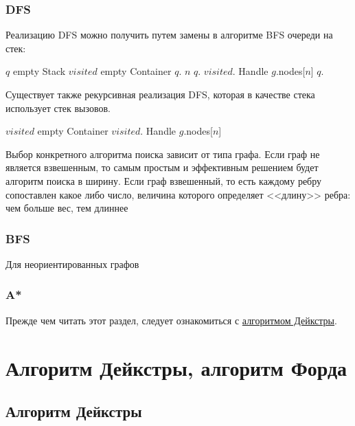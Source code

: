 \subsubsection{DFS}
Реализацию DFS можно получить путем замены в алгоритме BFS очереди на стек:
\begin{algorithmic}
  \State $q$ \asgn empty Stack
  \State $visited$ \asgn empty Container
  \State $q$.
    \State $n$ \asgn $q$.
    \State $visited$.
    \State Handle $g$.nodes[$n$]
        $q$.
      \EndIf
    \EndFor
  \EndWhile
\EndProcedure
\end{algorithmic}

Существует также рекурсивная реализация DFS, которая в качестве стека использует
стек вызовов.
\begin{algorithmic}
\State $visited$ \asgn empty Container
    \State\Return
  \EndIf
  \State $visited$.
  \State Handle $g$.nodes[$n$]
    \State {}
  \EndFor
\EndProcedure
\end{algorithmic}

Выбор конкретного алгоритма поиска зависит от типа графа. Если граф
не является взвешенным, то самым простым и эффективным решением будет
алгоритм поиска в ширину. Если граф взвешенный, то есть каждому ребру
сопоставлен какое либо число, величина которого определяет <<длину>> ребра:
чем больше вес, тем длиннее
\subsubsection{BFS}
Для неориентированных графов 
\subsubsection{A*}

Прежде чем читать этот раздел, следует ознакомиться с \hyperref[sec:dijkstra]{алгоритмом Дейкстры}.
\section{Алгоритм Дейкстры, алгоритм Форда}
\subsection{Алгоритм Дейкстры}
\label{sec:dijkstra}